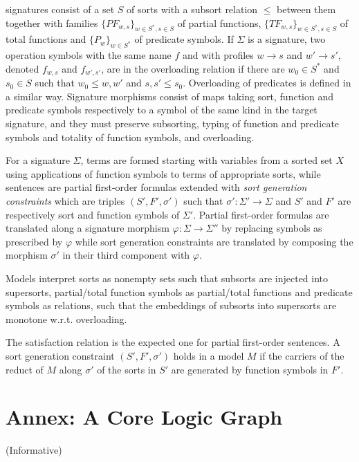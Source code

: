 \documentclass[10pt,fleqn,final]{scrreprt}
\newcommand{\informative}[0]{{\begin{center}{\Large{(Informative})}\end{center}} \bigskip}
\newcommand{\infannex}[1]{ \chapter{Annex: #1}  \informative }
\begin{document}
\CASL signatures consist of a set $S$ of sorts with a subsort relation $\leq$ between them
together with
families $\{PF_{w,s}\}_{w\in S^*, s\in S}$ of partial functions,
$\{TF_{w,s}\}_{w\in S^*, s\in S}$ of total functions and
$\{P_w\}_{w\in S^*}$ of predicate symbols. 
If $\Sigma$ is a signature, 
two operation symbols with the same name $f$ and with profiles
$w\rightarrow s$ and $w'\rightarrow s'$, denoted $f_{w,s}$ and $f_{w',s'}$, are in the
overloading relation if there are $w_0\in S^*$ and $s_0\in S$ such
that $w_0\leq w, w'$ and $s,s' \leq s_0$. Overloading of predicates is defined in a similar way.
Signature morphisms consist of maps taking sort, function and predicate symbols
respectively to a symbol of the same kind in the target signature, and they 
must preserve subsorting, typing of function and predicate symbols and totality of function symbols,
 and overloading. 

For a signature $\Sigma$, terms are formed starting with
variables from a sorted set $X$ using 
applications of function symbols to terms of appropriate sorts, while
sentences are partial first-order formulas extended with
\emph{sort generation constraints} which are triples $(S', F', \sigma')$ such that 
$\sigma':\Sigma'\rightarrow\Sigma$ and $S'$ and $F'$ are respectively sort and function symbols of
$\Sigma'$. 
Partial first-order formulas are translated along a signature morphism 
$\varphi:\Sigma\rightarrow\Sigma''$ by replacing symbols as prescribed by $\varphi$
while sort generation constraints are translated by
composing the morphism $\sigma'$ in their third component with $\varphi$.

Models interpret sorts as nonempty sets such that subsorts are injected into supersorts,
partial/total function symbols as partial/total functions and 
predicate symbols as relations,
 such that the embeddings of subsorts into
supersorts are monotone w.r.t. overloading.

The satisfaction relation is the expected one for partial first-order sentences. A sort generation
constraint $(S', F', \sigma')$ holds in a model $M$ if the carriers of the reduct of $M$ along $\sigma'$ 
of the sorts in $S'$ are generated by function symbols in $F'$.

\infannex{A Core Logic Graph}\label{a:graph}
\end{document}
